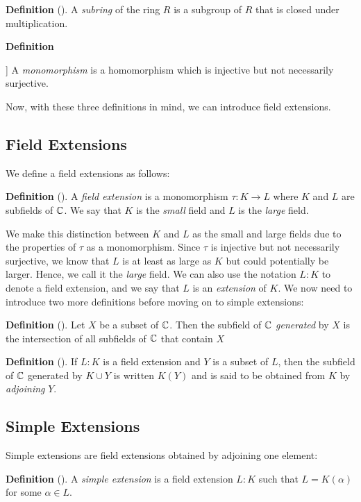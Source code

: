 \documentclass[11pt, a4paper, oneside]{article}
\theoremstyle{plain}
\theoremstyle{plain}
\theoremstyle{plain}
\theoremstyle{plain}
\theoremstyle{definition}
\theoremstyle{example}
\begin{document}
\textbf{Definition} (\cite[\S 7.1]{dummit}). A \textit{subring} of the ring $R$ is a subgroup of $R$ that is closed under multiplication.

\textbf{Definition} {\cite[\S 1.2]{stewart}] A \textit{monomorphism} is a homomorphism which is injective but not necessarily surjective.

Now, with these three definitions in mind, we can introduce field extensions.

\subsection{Field Extensions}

We define a field extensions as follows:

\textbf{Definition} (\cite[Definition 4.1]{stewart}). A \textit{field extension} is a monomorphism $\tau: K \to L$ where $K$ and $L$ are subfields of $\mathbb{C}$. We say that $K$ is the \textit{small} field and $L$ is the \textit{large} field.

We make this distinction between $K$ and $L$ as the small and large fields due to the properties of $\tau$ as a monomorphism. Since $\tau$ is injective but not necessarily surjective, we know that $L$ is at least as large as $K$ but could potentially be larger. Hence, we call it the \textit{large} field. We can also use the notation $L:K$ to denote a field extension, and we say that $L$ is an \textit{extension} of $K$. We now need to introduce two more definitions before moving on to simple extensions:

\textbf{Definition} (\cite[Definition 4.3]{stewart}). Let $X$ be a subset of $\mathbb{C}$. Then the subfield of $\mathbb{C}$ \textit{generated} by $X$ is the intersection of all subfields of $\mathbb{C}$ that contain $X$

\textbf{Definition} (\cite[Definition 4.7]{stewart}). If $L:K$ is a field extension and $Y$ is a subset of $L$, then the subfield of $\mathbb{C}$ generated by $K \cup Y$ is written $K(Y)$ and is said to be obtained from $K$ by \textit{adjoining} $Y$.

\newpage
\subsection{Simple Extensions}

Simple extensions are field extensions obtained by adjoining one element:

\textbf{Definition} (\cite[Definition 4.10]{stewart}). A \textit{simple extension} is a field extension $L:K$ such that $L = K(\alpha)$ for some $\alpha \in L$.

}
\end{document}
